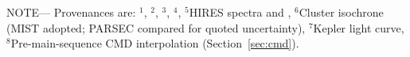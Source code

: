 \begin{table*}
\begin{tabular}{llcc}
\hline
\end{tabular}
\begin{flushleft}
 \footnotesize{ \textsc{NOTE}---
Provenances are:
$^1$\citet{gaia_collaboration_gaia_2018},
$^2$\citet{stassun_TIC8_2019},
$^3$\citet{skrutskie_tmass_2006},
$^4$\citet{Lindegren_2021_offset},
$^5$HIRES spectra and \citet{yee_SM_2017},
$^6$Cluster isochrone (MIST adopted; PARSEC compared for quoted
  uncertainty),
$^7$Kepler light curve,
$^8$Pre-main-sequence CMD interpolation (Section~\ref{sec:cmd}).
}
\end{flushleft}
\vspace{-0.5cm}
\end{table*}
